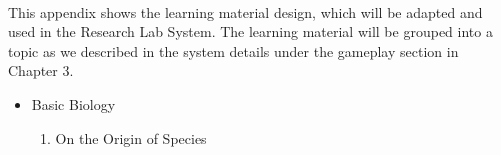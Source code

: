 \documentclass[12pt,oneside,openright,a4paper]{cpe-english-project}
\begin{document}
  \\
\label{appendix:learning-material}
This appendix shows the learning material design, which will be adapted and used in the Research Lab System. The learning material will be grouped into a topic as we described in the system details under the gameplay section in Chapter 3.

\begin{itemize}
	\item Basic Biology
	\begin{enumerate}
		\item On the Origin of Species \\
		\begin{minipage}[c]{\textwidth}\centering {}  \end{minipage}
		\begin{minipage}[c]{\textwidth}\centering {}  \end{minipage}

\end{enumerate}
\end{itemize}
\end{document}
